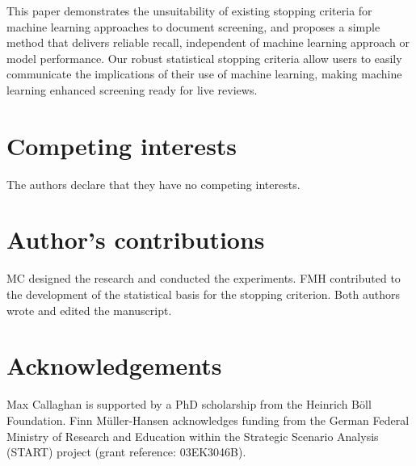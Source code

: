 \documentclass{bmcart}
\begin{document}
	This paper demonstrates the unsuitability of existing stopping criteria for machine learning approaches to document screening, and proposes a simple method that delivers reliable recall, independent of machine learning approach or model performance. Our robust statistical stopping criteria allow users to easily communicate the implications of their use of machine learning, making machine learning enhanced screening ready for live reviews.
	
	
\begin{backmatter}
	
	\section*{Competing interests}
	The authors declare that they have no competing interests.
	
	\section*{Author's contributions}
	MC designed the research and conducted the experiments. FMH contributed to the development of the statistical basis for the stopping criterion. Both authors wrote and edited the manuscript.
	
	\section*{Acknowledgements}
	Max Callaghan is supported by a PhD scholarship from the Heinrich Böll Foundation. Finn M\"{u}ller-Hansen acknowledges funding from the German Federal Ministry of Research and Education within the Strategic Scenario Analysis (START) project (grant reference: 03EK3046B).
		
	
	
	
\end{backmatter}
\end{document}
